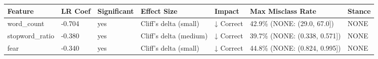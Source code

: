 \begin{tabular}{lllllll}
\toprule
Feature & LR Coef & Significant & Effect Size & Impact & Max Misclass Rate & Stance \\
\midrule
word\_count & -0.704 & yes & Cliff's delta (small) & ↓ Correct & 42.9\% (NONE: (29.0, 67.0]) & NONE \\
stopword\_ratio & -0.380 & yes & Cliff's delta (medium) & ↓ Correct & 39.7\% (NONE: (0.338, 0.571]) & NONE \\
fear & -0.340 & yes & Cliff's delta (small) & ↓ Correct & 44.8\% (NONE: (0.824, 0.995]) & NONE \\
\bottomrule
\end{tabular}
